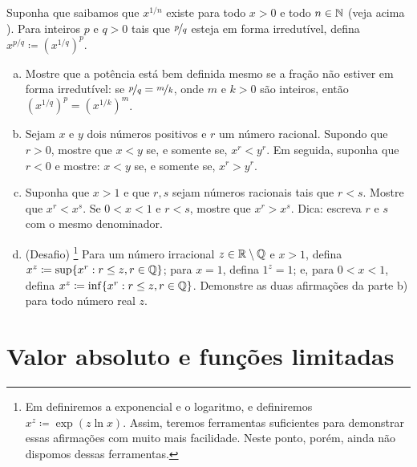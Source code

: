 \begin{samepage}
\begin{exercise} \label{exercise:realpower}
Suponha que saibamos que $x^{1/n}$ existe para todo $x > 0$ e todo $n \in
{\mathbb{N}}$ (veja acima ).
Para inteiros $p$ e $q > 0$ tais que $\nicefrac{p}{q}$ esteja em forma irredutível,
defina $x^{p/q} \coloneqq
{(x^{1/q})}^p$.
\begin{enumerate}[a)]
\item
Mostre que a potência está bem definida mesmo
se a fração não estiver em forma irredutível: se $\nicefrac{p}{q} =
\nicefrac{m}{k}$, onde $m$ e $k > 0$ são inteiros, então
${(x^{1/q})}^p = {(x^{1/k})}^m$.
\item
Sejam $x$ e $y$ dois números positivos e $r$ um número racional.
Supondo que $r > 0$, mostre que
$x < y$ se, e somente se, $x^r < y^r$. Em seguida, suponha que $r < 0$ e mostre:
$x < y$ se, e somente se, $x^r > y^r$.
\item
Suponha que $x > 1$ e que $r,s$ sejam números racionais tais que $r < s$.
Mostre que $x^r < x^s$. Se $0 < x < 1$ e $r < s$, mostre que $x^r > x^s$.
Dica: escreva $r$ e $s$ com o mesmo denominador.
\item
(Desafio)%
\footnote{Em
definiremos a exponencial e o logaritmo, e
definiremos $x^z \coloneqq \exp(z \ln x)$. Assim, teremos
ferramentas suficientes para demonstrar essas afirmações com muito mais facilidade. Neste
ponto, porém, ainda não dispomos dessas ferramentas.}
Para um número irracional $z \in {\mathbb{R}} \setminus {\mathbb{Q}}$ e $x > 1$, defina
$x^z \coloneqq \sup \{ x^r : r \leq z, r \in {\mathbb{Q}} \}$;
para $x=1$, defina $1^z = 1$;
e, para $0 < x < 1$, defina
$x^z \coloneqq \inf \{ x^r : r \leq z, r \in {\mathbb{Q}} \}$.
Demonstre as duas afirmações da parte b) para todo número real $z$.
\end{enumerate}
\end{exercise}
\end{samepage}




\sectionnewpage

\section{Valor absoluto e funções limitadas} \label{sec:absval}


